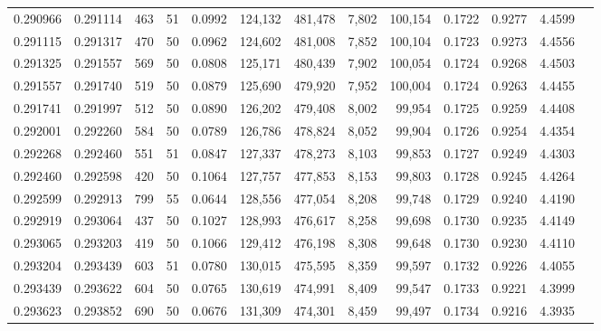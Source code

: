 \begin{tabular}{rrrrrrrrrrrrr}
0.290966 & 0.291114 &   463 &  51 &                                     0.0992 & 124,132 & 481,478 &   7,802 & 100,154 & 0.1722 & 0.9277 & 4.4599 \\
0.291115 & 0.291317 &   470 &  50 &                                     0.0962 & 124,602 & 481,008 &   7,852 & 100,104 & 0.1723 & 0.9273 & 4.4556 \\
0.291325 & 0.291557 &   569 &  50 &                                     0.0808 & 125,171 & 480,439 &   7,902 & 100,054 & 0.1724 & 0.9268 & 4.4503 \\
0.291557 & 0.291740 &   519 &  50 &                                     0.0879 & 125,690 & 479,920 &   7,952 & 100,004 & 0.1724 & 0.9263 & 4.4455 \\
0.291741 & 0.291997 &   512 &  50 &                                     0.0890 & 126,202 & 479,408 &   8,002 &  99,954 & 0.1725 & 0.9259 & 4.4408 \\
0.292001 & 0.292260 &   584 &  50 &                                     0.0789 & 126,786 & 478,824 &   8,052 &  99,904 & 0.1726 & 0.9254 & 4.4354 \\
0.292268 & 0.292460 &   551 &  51 &                                     0.0847 & 127,337 & 478,273 &   8,103 &  99,853 & 0.1727 & 0.9249 & 4.4303 \\
0.292460 & 0.292598 &   420 &  50 &                                     0.1064 & 127,757 & 477,853 &   8,153 &  99,803 & 0.1728 & 0.9245 & 4.4264 \\
0.292599 & 0.292913 &   799 &  55 &                                     0.0644 & 128,556 & 477,054 &   8,208 &  99,748 & 0.1729 & 0.9240 & 4.4190 \\
0.292919 & 0.293064 &   437 &  50 &                                     0.1027 & 128,993 & 476,617 &   8,258 &  99,698 & 0.1730 & 0.9235 & 4.4149 \\
0.293065 & 0.293203 &   419 &  50 &                                     0.1066 & 129,412 & 476,198 &   8,308 &  99,648 & 0.1730 & 0.9230 & 4.4110 \\
0.293204 & 0.293439 &   603 &  51 &                                     0.0780 & 130,015 & 475,595 &   8,359 &  99,597 & 0.1732 & 0.9226 & 4.4055 \\
0.293439 & 0.293622 &   604 &  50 &                                     0.0765 & 130,619 & 474,991 &   8,409 &  99,547 & 0.1733 & 0.9221 & 4.3999 \\
0.293623 & 0.293852 &   690 &  50 &                                     0.0676 & 131,309 & 474,301 &   8,459 &  99,497 & 0.1734 & 0.9216 & 4.3935 \\

\end{tabular}
